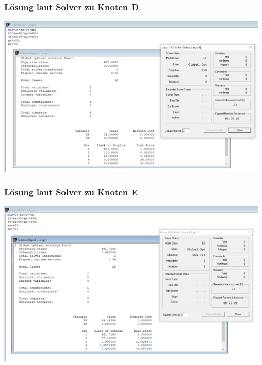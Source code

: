 \documentclass[a4paper,11pt]{article}
\begin{document}
\subsubsection*{Lösung laut Solver zu Knoten D}
\begin{centering}
	\includegraphics[width=1\linewidth]{src/blatt_5_aufgabe_2_teilaufgabe_b_knoten_d_loesung_solver.png}
\end{centering}

\subsubsection*{Lösung laut Solver zu Knoten E}
\begin{centering}
	\includegraphics[width=1\linewidth]{src/blatt_5_aufgabe_2_teilaufgabe_b_knoten_e_loesung_solver.png}
\end{centering}
\end{document}
